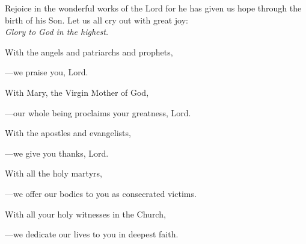 \intercessions\indent

\begin{hangpar}

Rejoice in the wonderful works of the Lord for he has given us hope through the birth of his Son. Let us all cry out with great joy:\\
\emph{Glory to God in the highest.}

\medskip With the angels and patriarchs and prophets,

{\color{red}---\thinspace}we praise you, Lord.

\medskip With Mary, the Virgin Mother of God,

{\color{red}---\thinspace}our whole being proclaims your greatness, Lord.

\medskip With the apostles and evangelists,

{\color{red}---\thinspace}we give you thanks, Lord.

\medskip With all the holy martyrs,

{\color{red}---\thinspace}we offer our bodies to you as consecrated victims.

\medskip With all your holy witnesses in the Church,

{\color{red}---\thinspace}we dedicate our lives to you in deepest faith.

\medskip

\end{hangpar}
